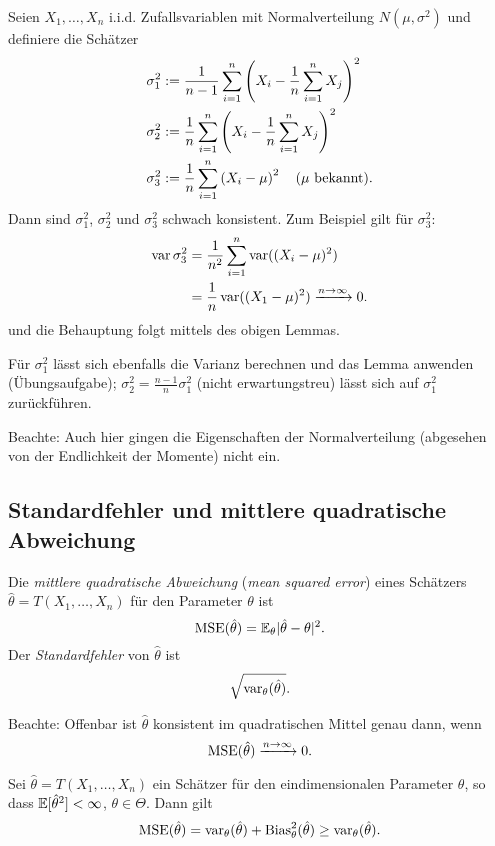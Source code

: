 \begin{exmp}
  Seien $X_1, \ldots, X_n$ i.i.d. Zufallsvariablen mit Normalverteilung
  $N(\mu,\sigma^2)$ und definiere die Schätzer
  \begin{align*}
    \sigma^2_1
    &:= \frac{1}{n-1} \sum_{i=1}^n
      \left( X_i - \frac{1}{n} \sum_{i=1}^n X_j \right)^2 \\
    \sigma^2_2
    &:= \frac{1}{n} \sum_{i=1}^n
      \left( X_i - \frac{1}{n} \sum_{i=1}^n X_j \right)^2 \\
    \sigma^2_3
    &:= \frac{1}{n} \sum_{i=1}^n
      \left( X_i - \mu \right)^2 \quad \text{($\mu$ bekannt)}.
  \end{align*}
  Dann sind $\sigma^2_1$, $\sigma^2_2$ und $\sigma^2_3$ schwach konsistent. Zum
  Beispiel gilt für $\sigma^2_3$:
  \begin{align*}
    \operatorname{var}{\sigma^2_3}
    &= \frac{1}{n^2} \sum_{i=1}^n \operatorname{var}((X_i-\mu)^2) \\
    &= \frac{1}{n} \operatorname{var}((X_1 - \mu)^2) \xrightarrow{n \to \infty} 0.
  \end{align*}
  und die Behauptung folgt mittels des obigen Lemmas.
  
Für $\sigma^2_1$ lässt sich ebenfalls die Varianz berechnen und das Lemma
anwenden (Übungsaufgabe); $\sigma^2_2 = \frac{n-1}{n} \sigma^2_1$ (nicht
erwartungstreu) lässt sich auf $\sigma^2_1$ zurückführen.

Beachte: Auch hier gingen die Eigenschaften der Normalverteilung (abgesehen von
der Endlichkeit der Momente) nicht ein.
\end{exmp}

\subsection{Standardfehler und mittlere quadratische Abweichung}
\begin{defn}
  Die \emph{mittlere quadratische Abweichung} (\emph{mean squared error}) eines
  Schätzers $\hat{\theta} = T(X_1, \ldots, X_n)$ für den Parameter $\theta$ ist
  \[ \operatorname*{MSE}(\hat{\theta}) = \mathbb{E}_\theta| \hat{\theta} - \theta |^2. \]
  Der \emph{Standardfehler} von $\hat{\theta}$ ist
  \[ \sqrt{\operatorname{var}_\theta(\hat{\theta})}. \]

  Beachte: Offenbar ist $\hat{\theta}$ konsistent im quadratischen Mittel genau
  dann, wenn
  \[ \operatorname*{MSE}( \hat{\theta} ) \xrightarrow{n \to \infty} 0. \]
\end{defn}

\begin{lem}
  Sei $\hat{\theta} = T(X_1, \ldots, X_n)$ ein Schätzer für den eindimensionalen
  Parameter $\theta$, so dass $\mathbb{E}[\hat{\theta}^2] < \infty$, $\theta \in
  \Theta$. Dann gilt
  \[ \operatorname*{MSE}( \hat{\theta}) = \operatorname{var}_\theta(\hat{\theta}) +
    \operatorname{Bias}_\theta^2(\hat{\theta}) \ge \operatorname{var}_\theta(\hat{\theta}). \]
\end{lem}

